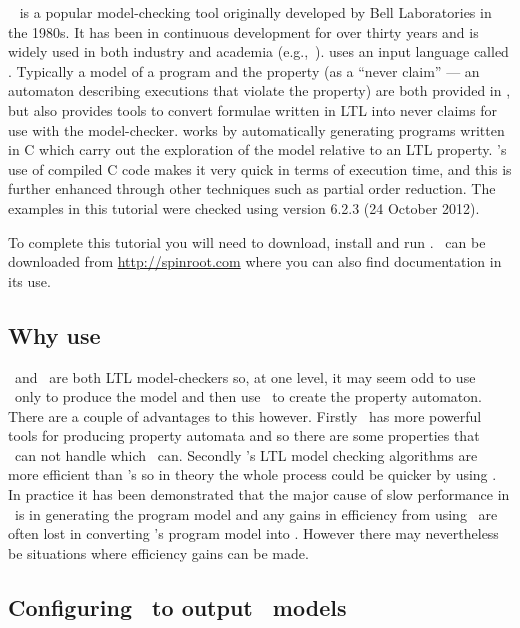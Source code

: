 \documentclass[a4]{article}
\begin{document}
\spin{}~\cite{holzmann04spin} is a popular model-checking tool
originally developed by Bell Laboratories in the 1980s.  It has been
in continuous development for over thirty years and is widely used in
both industry and academia
(e.g.,~\cite{havelund00formal,kars96application,kirsch11technical}).
\spin{} uses an input language called \promela{}.  Typically a model
of a program and the property (as a ``never claim'' --- an automaton
describing executions that violate the property) are both provided in
\promela{}, but \spin{} also provides tools to convert formulae
written in LTL into never claims for use with the
model-checker. \spin{} works by automatically generating programs
written in C which carry out the exploration of the model relative to
an LTL property. \spin{}'s use of compiled C code makes it very quick
in terms of execution time, and this is further enhanced through other
techniques such as partial order reduction. The examples in this tutorial were checked using \spin{} version 6.2.3 (24 October 2012).

To complete this tutorial you will need to download, install and run \spin.  \spin\ can be downloaded from \url{http://spinroot.com} where you can also find documentation in its use.

\subsection{Why use \spin{}}

\spin\ and \ajpf\ are both LTL model-checkers so, at one level, it may seem odd to use \ajpf\ only to produce the model and then use \spin\ to create the property automaton.  There are a couple of advantages to this however.  Firstly \spin\ has more powerful tools for producing property automata and so there are some properties that \ajpf\ can not handle which \spin\ can.  Secondly \spin's LTL model checking algorithms are more efficient than \ajpf's so in theory the whole process could be quicker by using \spin.  In practice it has been demonstrated that the major cause of slow performance in \ajpf\ is in generating the program model and any gains in efficiency from using \spin\ are often lost in converting \ajpf's program model into \promela{}.  However there may  nevertheless be situations where efficiency gains can be made.

\subsection{Configuring \ajpf\ to output \spin\ models}
\end{document}
